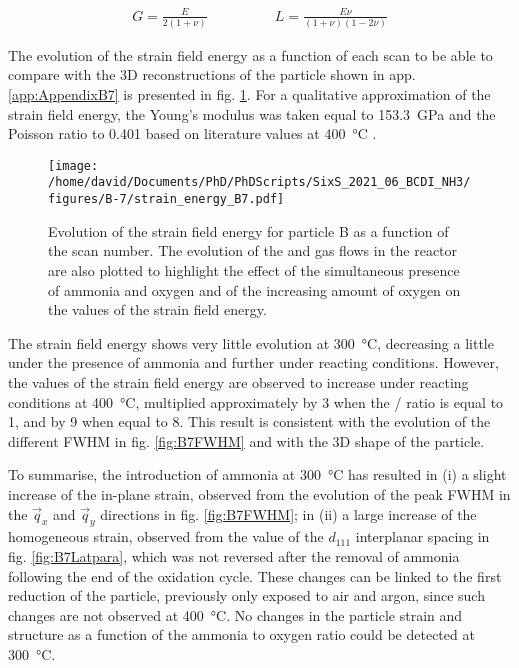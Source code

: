 \begin{align}
    G = \frac{E}{2(1+\nu)} \qquad & \qquad L = \frac{E \nu}{(1+\nu)(1-2\nu)}
    \label{eq:GandNu}
\end{align}

The evolution of the strain field energy as a function of each scan to be able to compare with the 3D reconstructions of the particle shown in app. \ref{app:AppendixB7} is presented in fig. \ref{fig:B7SFE}.
For a qualitative approximation of the strain field energy, the Young's modulus was taken equal to \qty{153.3}{\giga\pascal} and the Poisson ratio to \num{0.401} based on literature values at \qty{400}{\degreeCelsius} \parencite{Matthey2022}.

\begin{figure}[!htb]
    \centering
    \texttt{[image: /home/david/Documents/PhD/PhDScripts/SixS\_2021\_06\_BCDI\_NH3/figures/B-7/strain\_energy\_B7.pdf]}
    \caption{
        Evolution of the strain field energy for particle B as a function of the scan number.
        The evolution of the  and  gas flows in the reactor are also plotted to highlight the effect of the simultaneous presence of ammonia and oxygen and of the increasing amount of oxygen on the values of the strain field energy.
    }
    \label{fig:B7SFE}
\end{figure}

The strain field energy shows very little evolution at \qty{300}{\degreeCelsius}, decreasing a little under the presence of ammonia and further under reacting conditions.
However, the values of the strain field energy are observed to increase under reacting conditions at \qty{400}{\degreeCelsius}, multiplied approximately by \num{3} when the / ratio is equal to 1, and by \num{9} when equal to 8.
This result is consistent with the evolution of the different FWHM in fig. \ref{fig:B7FWHM} and with the 3D shape of the particle.

To summarise, the introduction of ammonia at \qty{300}{\degreeCelsius} has resulted in (i) a slight increase of the in-plane strain, observed from the evolution of the peak FWHM in the $\vec{q}_x$ and $\vec{q}_y$ directions in fig. \ref{fig:B7FWHM}; in (ii) a large increase of the homogeneous strain, observed from the value of the $d_{111}$ interplanar spacing in fig. \ref{fig:B7Latpara}, which was not reversed after the removal of ammonia following the end of the oxidation cycle.
These changes can be linked to the first reduction of the particle, previously only exposed to air and argon, since such changes are not observed at \qty{400}{\degreeCelsius}.
No changes in the particle strain and structure as a function of the ammonia to oxygen ratio could be detected at \qty{300}{\degreeCelsius}.

